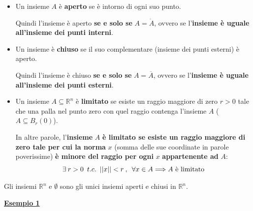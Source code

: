 \documentclass[a4paper]{article}
\newcommand{\definition}[1]{\textcolor{Red3}{\textbf{#1}}}
\newcommand{\example}[1]{\textcolor{Green4}{\textbf{#1}}}
\begin{document}
	\begin{itemize}
		\item Un insieme $A$ è \definition{aperto} se è intorno di ogni suo punto. 
		
		Quindi l'insieme è aperto \textbf{se e solo se} $A = \mathring{A}$, ovvero se l'\textbf{insieme è uguale all'insieme dei punti interni}.
		
		\item Un insieme è \definition{chiuso} se il suo complementare (insieme dei punti esterni) è aperto.
		
		Quindi l'insieme è chiuso \textbf{se e solo se} $A = \overline{A}$, ovvero se l'\textbf{insieme è uguale all'insieme dei punti esterni}.

		\item Un insieme $A \subseteq \mathbb{R}^{n}$ è \definition{limitato} se esiste un raggio maggiore di zero $r > 0$ tale che una palla nel punto zero con quel raggio contenga l'insieme $A$ ($A \subseteq B_{r}\left(0\right)$).
		
		In altre parole, l'\textbf{insieme} $A$ \textbf{è limitato se esiste un raggio maggiore di zero tale per cui la norma} $x$ (somma delle sue coordinate in parole poverissime) \textbf{è minore del raggio per ogni} $x$ \textbf{appartenente ad} $A$:
		\begin{equation*}
			\exists \: r > 0 \hspace{.5em} t.c. \hspace{.5em} ||x|| < r \: , \hspace{.5em} \forall x \in A \Longrightarrow A \text{ è limitato}
		\end{equation*}
	\end{itemize}
	Gli insiemi $\mathbb{R}^{n}$ e $\emptyset$ sono gli unici insiemi aperti e chiusi in $\mathbb{R}^{n}$.\newpage
	
	\begin{flushleft}
		\example{\underline{Esempio 1}}
	\end{flushleft}
\end{document}
